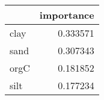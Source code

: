 \begin{tabular}{lr}
\toprule
 & importance \\
\midrule
clay & 0.333571 \\
sand & 0.307343 \\
orgC & 0.181852 \\
silt & 0.177234 \\
\bottomrule
\end{tabular}
